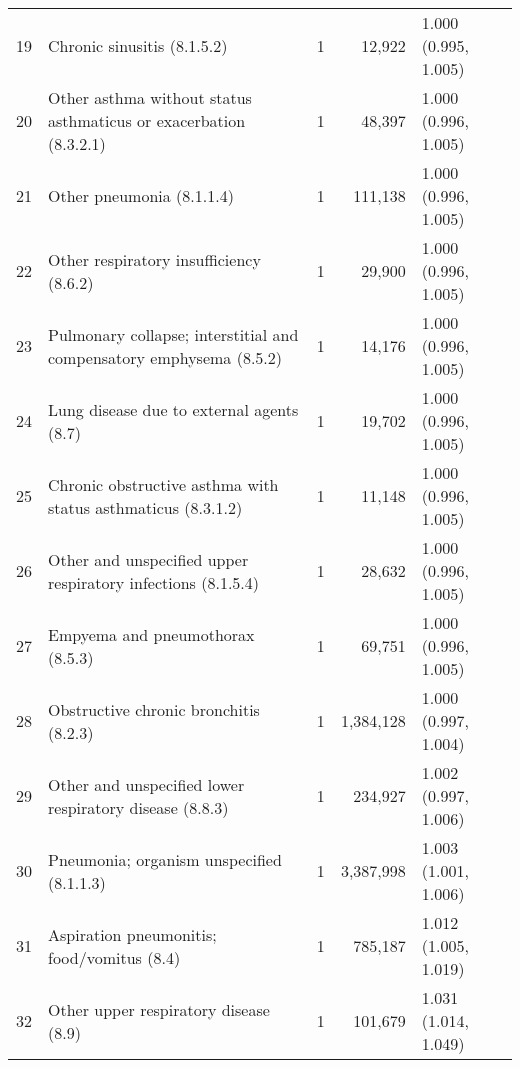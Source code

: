 \begin{tabular}{lp{6.5cm}rrp{2.2cm}}
    19 & Chronic sinusitis (8.1.5.2) &    1 & 12,922 & 1.000 (0.995, 1.005) \\ 
    20 & Other asthma without status asthmaticus or exacerbation (8.3.2.1) &    1 & 48,397 & 1.000 (0.996, 1.005) \\ 
    21 & Other pneumonia (8.1.1.4) &    1 & 111,138 & 1.000 (0.996, 1.005) \\ 
    22 & Other respiratory insufficiency (8.6.2) &    1 & 29,900 & 1.000 (0.996, 1.005) \\ 
    23 & Pulmonary collapse; interstitial and compensatory emphysema (8.5.2) &    1 & 14,176 & 1.000 (0.996, 1.005) \\ 
    24 & Lung disease due to external agents (8.7) &    1 & 19,702 & 1.000 (0.996, 1.005) \\ 
    25 & Chronic obstructive asthma with status asthmaticus (8.3.1.2) &    1 & 11,148 & 1.000 (0.996, 1.005) \\ 
    26 & Other and unspecified upper respiratory infections (8.1.5.4) &    1 & 28,632 & 1.000 (0.996, 1.005) \\ 
    27 & Empyema and pneumothorax (8.5.3) &    1 & 69,751 & 1.000 (0.996, 1.005) \\ 
    28 & Obstructive chronic bronchitis (8.2.3) &    1 & 1,384,128 & 1.000 (0.997, 1.004) \\ 
    29 & Other and unspecified lower respiratory disease (8.8.3) &    1 & 234,927 & 1.002 (0.997, 1.006) \\ 
    30 & Pneumonia; organism unspecified (8.1.1.3) &    1 & 3,387,998 & 1.003 (1.001, 1.006) \\ 
    31 & Aspiration pneumonitis; food/vomitus (8.4) &    1 & 785,187 & 1.012 (1.005, 1.019) \\ 
    32 & Other upper respiratory disease (8.9) &    1 & 101,679 & 1.031 (1.014, 1.049) \\ 
   \hline
\end{tabular}

